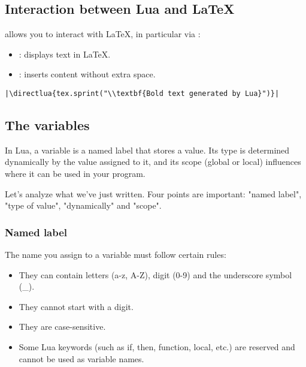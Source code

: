 \subsection{Interaction between Lua and LaTeX} %
\label{sub:interaction_between_lua_and_latex}

\tkzEngine{\LUALATEX} allows you to interact with LaTeX, in particular via :

\begin{itemize}
\item {}: displays text in LaTeX.
\item {}: inserts content without extra space.\\
\end{itemize}

\begin{mybox}
\begin{verbatim}
|\directlua{tex.sprint("\\textbf{Bold text generated by Lua}")}|
\end{verbatim}
\end{mybox}


\subsection{The variables} %
\label{sub:the_variables}

\begin{mybox}
  In Lua, a variable is a named label that stores a value. Its type is determined dynamically by the value assigned to it, and its scope (global or local) influences where it can be used in your program.
\end{mybox}

Let's analyze what we've just written. Four points are important: "named label", "type of value", "dynamically" and "scope".

\subsubsection{Named label} %
\label{ssub:named_label}
The name you assign to a variable must follow certain rules:

\begin{itemize}
  \item They can contain letters (a-z, A-Z), digit (0-9) and the underscore symbol (\_).
  \item They cannot start with a digit.
  \item They are case-sensitive.
  \item Some Lua keywords (such as if, then, function, local, etc.) are reserved and cannot be used as variable names.
\end{itemize}

